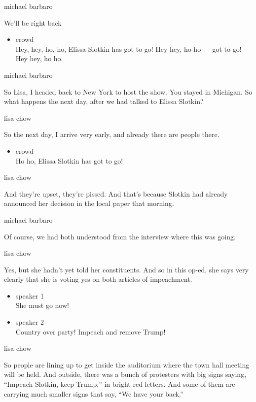 michael barbaro

We'll be right back

\begin{itemize}
\tightlist
\item
  crowd\\
  Hey, hey, ho, ho, Elissa Slotkin has got to go! Hey hey, ho ho --- got
  to go! Hey hey, ho ho.
\end{itemize}

michael barbaro

So Lisa, I headed back to New York to host the show. You stayed in
Michigan. So what happens the next day, after we had talked to Elissa
Slotkin?

lisa chow

So the next day, I arrive very early, and already there are people
there.

\begin{itemize}
\tightlist
\item
  crowd\\
  Ho ho, Elissa Slotkin has got to go!
\end{itemize}

lisa chow

And they're upset, they're pissed. And that's because Slotkin had
already announced her decision in the local paper that morning.

michael barbaro

Of course, we had both understood from the interview where this was
going.

lisa chow

Yes, but she hadn't yet told her constituents. And so in this op-ed, she
says very clearly that she is voting yes on both articles of
impeachment.

\begin{itemize}
\item
  speaker 1\\
  She must go now!
\item
  speaker 2\\
  Country over party! Impeach and remove Trump!
\end{itemize}

lisa chow

So people are lining up to get inside the auditorium where the town hall
meeting will be held. And outside, there was a bunch of protesters with
big signs saying, ``Impeach Slotkin, keep Trump,'' in bright red
letters. And some of them are carrying much smaller signs that say, ``We
have your back.''

